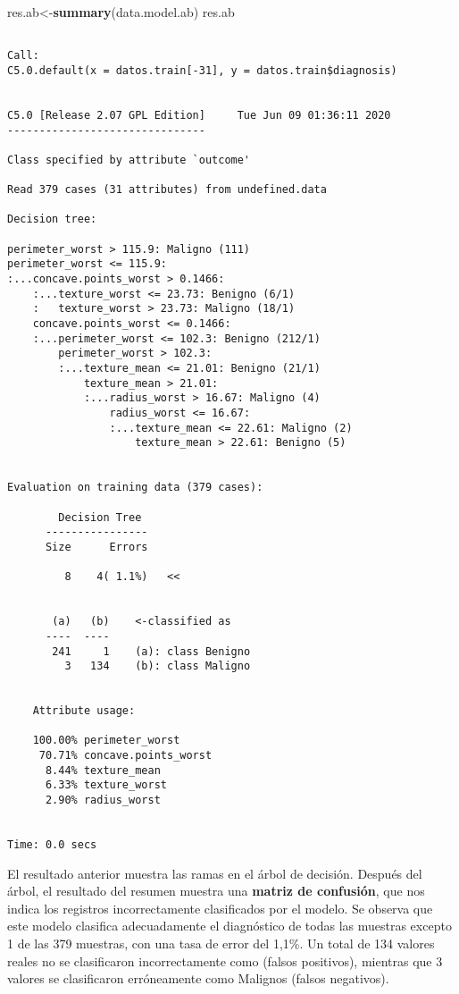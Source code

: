 \documentclass[
]{article}
\newenvironment{Shaded}{\begin{snugshade}}{\end{snugshade}}
\newcommand{\KeywordTok}[1]{\textcolor[rgb]{0.13,0.29,0.53}{\textbf{#1}}}
\newcommand{\NormalTok}[1]{#1}
\begin{document}
\begin{Shaded}
\begin{Highlighting}[]
\NormalTok{res.ab<-}\KeywordTok{summary}\NormalTok{(data.model.ab)}
\NormalTok{res.ab}
\end{Highlighting}
\end{Shaded}

\begin{verbatim}

Call:
C5.0.default(x = datos.train[-31], y = datos.train$diagnosis)


C5.0 [Release 2.07 GPL Edition]     Tue Jun 09 01:36:11 2020
-------------------------------

Class specified by attribute `outcome'

Read 379 cases (31 attributes) from undefined.data

Decision tree:

perimeter_worst > 115.9: Maligno (111)
perimeter_worst <= 115.9:
:...concave.points_worst > 0.1466:
    :...texture_worst <= 23.73: Benigno (6/1)
    :   texture_worst > 23.73: Maligno (18/1)
    concave.points_worst <= 0.1466:
    :...perimeter_worst <= 102.3: Benigno (212/1)
        perimeter_worst > 102.3:
        :...texture_mean <= 21.01: Benigno (21/1)
            texture_mean > 21.01:
            :...radius_worst > 16.67: Maligno (4)
                radius_worst <= 16.67:
                :...texture_mean <= 22.61: Maligno (2)
                    texture_mean > 22.61: Benigno (5)


Evaluation on training data (379 cases):

        Decision Tree   
      ----------------  
      Size      Errors  

         8    4( 1.1%)   <<


       (a)   (b)    <-classified as
      ----  ----
       241     1    (a): class Benigno
         3   134    (b): class Maligno


    Attribute usage:

    100.00% perimeter_worst
     70.71% concave.points_worst
      8.44% texture_mean
      6.33% texture_worst
      2.90% radius_worst


Time: 0.0 secs
\end{verbatim}

El resultado anterior muestra las ramas en el árbol de decisión. Después
del árbol, el resultado del resumen muestra una \textbf{matriz de
confusión}, que nos indica los registros incorrectamente clasificados
por el modelo. Se observa que este modelo clasifica adecuadamente el
diagnóstico de todas las muestras excepto 1 de las 379 muestras, con una
tasa de error del 1,1\%. Un total de 134 valores reales no se
clasificaron incorrectamente como (falsos positivos), mientras que 3
valores se clasificaron erróneamente como Malignos (falsos negativos).
\end{document}
